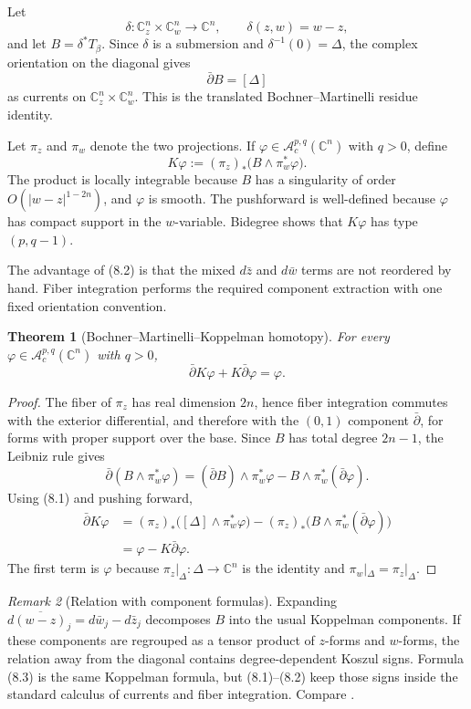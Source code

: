 \documentclass[11pt,a4paper]{article}
\newtheorem{theorem}{Theorem}[section]
\theoremstyle{definition}
\theoremstyle{remark}
\newtheorem{remark}[theorem]{Remark}
\newcommand{\C}{\mathbb C}
\newcommand{\A}{\mathcal A}
\newcommand{\ddbar}{\bar\partial}
\newcommand{\prz}{\pi_z}
\newcommand{\prw}{\pi_w}
\begin{document}
Let
\[
\delta:\C_z^n\times\C_w^n\to\C^n,
\qquad \delta(z,w)=w-z,
\]
and let $B=\delta^*T_\beta$. Since $\delta$ is a submersion and $\delta^{-1}(0)=\Delta$, the complex orientation on the diagonal gives
\[
\ddbar B=[\Delta]
\tag{8.1}
\]
as currents on $\C_z^n\times\C_w^n$. This is the translated Bochner--Martinelli residue identity.

Let $\prz$ and $\prw$ denote the two projections. If $\varphi\in\A_c^{p,q}(\C^n)$ with $q>0$, define
\[
K\varphi
:=(\prz)_*\bigl(B\wedge\prw^*\varphi\bigr).
\tag{8.2}
\]
The product is locally integrable because $B$ has a singularity of order $O(|w-z|^{1-2n})$, and $\varphi$ is smooth. The pushforward is well-defined because $\varphi$ has compact support in the $w$-variable. Bidegree shows that $K\varphi$ has type $(p,q-1)$.

The advantage of (8.2) is that the mixed $d\bar z$ and $d\bar w$ terms are not reordered by hand. Fiber integration performs the required component extraction with one fixed orientation convention.

\begin{theorem}[Bochner--Martinelli--Koppelman homotopy]
For every $\varphi\in\A_c^{p,q}(\C^n)$ with $q>0$,
\[
\ddbar K\varphi+K\ddbar\varphi=\varphi.
\tag{8.3}
\]
\end{theorem}

\begin{proof}
The fiber of $\prz$ has real dimension $2n$, hence fiber integration commutes with the exterior differential, and therefore with the $(0,1)$ component $\ddbar$, for forms with proper support over the base. Since $B$ has total degree $2n-1$, the Leibniz rule gives
\[
\ddbar(B\wedge\prw^*\varphi)
=(\ddbar B)\wedge\prw^*\varphi
-B\wedge\prw^*(\ddbar\varphi).
\]
Using (8.1) and pushing forward,
\begin{align*}
\ddbar K\varphi
&=(\prz)_*\bigl([\Delta]\wedge\prw^*\varphi\bigr)
 -(\prz)_*\bigl(B\wedge\prw^*(\ddbar\varphi)\bigr)\\
&=\varphi-K\ddbar\varphi.
\end{align*}
The first term is $\varphi$ because $\prz|_\Delta:\Delta\to\C^n$ is the identity and $\prw|_\Delta=\prz|_\Delta$.
\end{proof}

\begin{remark}[Relation with component formulas]
Expanding $d\overline{(w-z)}_j=d\bar w_j-d\bar z_j$ decomposes $B$ into the usual Koppelman components. If these components are regrouped as a tensor product of $z$-forms and $w$-forms, the relation away from the diagonal contains degree-dependent Koszul signs. Formula (8.3) is the same Koppelman formula, but (8.1)--(8.2) keep those signs inside the standard calculus of currents and fiber integration. Compare \cite[Chapter I, \S3, especially the Koppelman formula and the Dolbeault--Grothendieck lemma]{Demailly}.
\end{remark}
\end{document}
